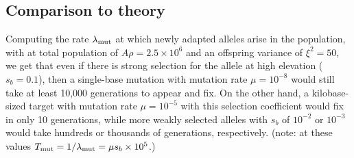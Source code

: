 {{%




\subsection*{Comparison to theory}


Computing the rate $\lambda_{\text{mut}}$ at which newly adapted alleles arise in the population,
with at total population of $A \rho = 2.5 \times 10^6$ and an offspring variance of $\xi^2 = 50$,
we get that even if there is strong selection for the allele at high elevation ($s_b=0.1$),
then a single-base mutation with mutation rate $\mu=10^{-8}$ would still take at least 10,000 generations to appear and fix.
On the other hand, a kilobase-sized target with mutation rate $\mu=10^{-5}$
with this selection coefficient would fix in only 10 generations,
while more weakly selected alleles with $s_b$ of $10^{-2}$ or $10^{-3}$ would take hundreds or thousands of generations, respectively.
(note: at these values $T_{\text{mut}} = 1/\lambda_{\text{mut}} = \mu s_b \times 10^5$.)

}}
